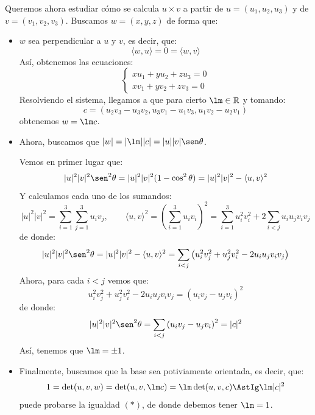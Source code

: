 \noindent
Queremos ahora estudiar cómo se calcula $u\times v$ a partir de $u = (u_1,u_2,u_3)$ y de $v = (v_1,v_2,v_3)$. Buscamos $w = (x,y,z)$ de forma que:
\begin{itemize}
    \item $w$ sea perpendicular a $u$ y $v$, es decir, que:
        \begin{equation*}
            \langle w,u \rangle = 0 = \langle w,v \rangle 
        \end{equation*}
        Así, obtenemos las ecuaciones:
        \begin{equation*}
            \left\{\begin{array}{l}
                xu_1 + yu_2 + zu_3 = 0 \\
                xv_1 + yv_2 + zv_3 = 0
            \end{array}\right.
        \end{equation*}
        Resolviendo el sistema, llegamos a que para cierto $\lm\in \mathbb{R}$ y tomando:
        \begin{equation*}
            c = (u_2v_3-u_3v_2, u_3v_1-u_1v_3, u_1v_2-u_2v_1)
        \end{equation*}
        obtenemos $w = \lm c$.
    \item Ahora, buscamos que $|w| = |\lm||c| = |u||v|\sen\theta$.

        Vemos en primer lugar que:
        \begin{equation*}
            |u|^2|v|^2\sen^2\theta = |u|^2|v|^2(1-\cos^2\theta) = |u|^2|v|^2 - \langle u,v \rangle^2
        \end{equation*}
        Y calculamos cada uno de los sumandos:
        \begin{equation*}
            |u|^2|v|^2 = \sum_{i=1}^{3}\sum_{j=1}^{3}u_iv_j, \qquad \langle u,v \rangle^2 = {\left(\sum_{i=1}^{3}u_iv_i\right)}^{2} = \sum_{i=1}^{3}u_i^2v_i^2 + 2\sum_{i<j}u_iu_jv_iv_j
        \end{equation*}
        de donde:
        \begin{equation*}
            |u|^2|v|^2\sen^2\theta = |u|^2|v|^2-\langle u,v \rangle^2 = \sum_{i<j}\left(u_i^2v_j^2 + u_j^2v_i^2 - 2u_iu_jv_iv_j\right)
        \end{equation*}
        Ahora, para cada $i<j$ vemos que:
        \begin{equation*}
            u_i^2v_j^2 + u_j^2v_i^2 - 2u_iu_jv_iv_j = {(u_iv_j-u_jv_i)}^{2}
        \end{equation*}
        de donde:
        \begin{equation*}
             |u|^2|v|^2\sen^2\theta = \sum_{i<j}{(u_iv_j-u_jv_i)}^{2} = |c|^2
        \end{equation*}
        Así, tenemos que $\lm = \pm 1$.
    \item Finalmente, buscamos que la base sea potiviamente orientada, es decir, que:
        \begin{equation*}
            1 = \det(u,v,w) = \det(u,v,\lm c) = \lm \det(u,v,c) \AstIg \lm |c|^2
        \end{equation*}
        puede probarse la igualdad $(\ast)$, de donde debemos tener $\lm = 1$.
\end{itemize}

